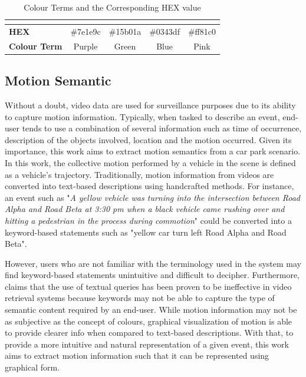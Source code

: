 \begin{table}[!ht]
\begin{tabular}{lcccc}
\multicolumn{1}{l|}{}                     & \multicolumn{1}{l|}{\cellcolor[HTML]{7E1E9C}} & \multicolumn{1}{l|}{\cellcolor[HTML]{15B01A}} & \multicolumn{1}{l|}{\cellcolor[HTML]{0343DF}} & \multicolumn{1}{l|}{\cellcolor[HTML]{FF81C0}} \\ \hline
\multicolumn{1}{|l|}{\textbf{HEX}}        & \multicolumn{1}{c|}{\#7e1e9c}                 & \multicolumn{1}{c|}{\#15b01a}                 & \multicolumn{1}{c|}{\#0343df}                 & \multicolumn{1}{c|}{\#ff81c0}                 \\ \hline
\multicolumn{1}{|l|}{\textbf{Colour Term}}  & \multicolumn{1}{c|}{Purple}                   & \multicolumn{1}{c|}{Green}                    & \multicolumn{1}{c|}{Blue}                     & \multicolumn{1}{c|}{Pink}                     \\ \hline
\end{tabular}
\caption{Colour Terms and the Corresponding HEX value}
\label{table:colorshex}
\end{table}



\subsection{Motion Semantic}

Without a doubt, video data are used for surveillance purposes due to its ability to capture motion information.
Typically, when tasked to describe an event, end-user tends to use a combination of several information such as time of occurrence, description of the objects involved, location and the motion occurred.
Given its importance, this work aims to extract motion semantics from a car park scenario.
In this work, the collective motion performed by a vehicle in the scene is defined as a vehicle's trajectory.
Traditionally, motion information from videos are converted into text-based descriptions using handcrafted methods. For instance, an event such as "\textit{A yellow vehicle was turning into the intersection between Road Alpha and Road Beta at 3:30 pm when a black vehicle came rushing over and hitting a pedestrian in the process during commotion}" could be converted into a keyword-based statements such as "yellow car turn left Road Alpha and Road Beta".

However, users who are not familiar with the terminology used in the system may find keyword-based statements unintuitive and difficult to decipher.
Furthermore, \cite{bhaumik2016hybrid} claims that the use of textual queries has been proven to be ineffective in video retrieval systems because keywords may not be able to capture the type of semantic content required by an end-user.
While motion information may not be as subjective as the concept of colours, graphical visualization of motion is able to provide clearer info when compared to text-based descriptions.
With that, to provide a more intuitive and natural representation of a given event, this work aims to extract motion information such that it can be represented using graphical form.

